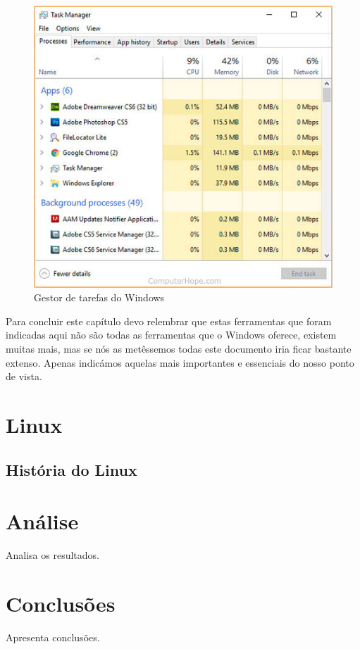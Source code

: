 \documentclass{report}
\begin{document}
\begin{figure}[h!]
\includegraphics[width=1\textwidth]{taskmana10.jpg}
\centering
\caption{Gestor de tarefas do Windows}
\end{figure}

Para concluir este capítulo devo relembrar que estas ferramentas que foram indicadas aqui não são todas as ferramentas que o Windows oferece, existem muitas mais, mas se nós as metêssemos todas este documento iria ficar bastante extenso. 
Apenas indicámos aquelas mais importantes e essenciais do nosso ponto de vista.


\chapter{Linux}
\label{chap.linux}

\section{História do Linux}





\chapter{Análise}
\label{chap.analise}
Analisa os resultados.

\chapter{Conclusões}
\label{chap.conclusao}
Apresenta conclusões.
\end{document}
